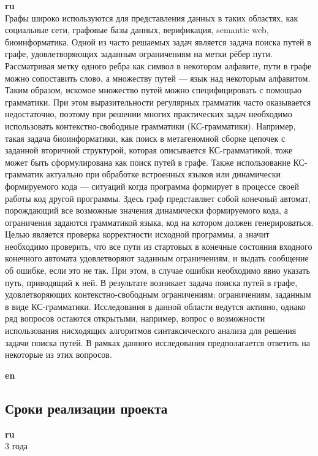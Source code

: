 \documentclass[12pt]{article}  %
\theoremstyle{remark}
\begin{document}
\textbf{ru}\\
Графы широко используются для представления данных в таких областях, как социальные сети, графовые базы данных, верификация, semantic web, биоинформатика. Одной из часто решаемых задач является задача поиска путей в графе, удовлетворяющих заданным ограничениям на метки рёбер пути. Рассматривая метку одного ребра как символ в некотором алфавите, пути в графе можно сопоставить слово, а множеству путей — язык над некоторым алфавитом. Таким образом, искомое множество путей можно специфицировать с помощью грамматики. При этом выразительности регулярных грамматик часто оказывается недостаточно, поэтому при решении многих практических задач необходимо использовать контекстно-свободные грамматики (КС-грамматики). Например, такая задача биоинформатики, как поиск в метагеномной сборке цепочек с заданной вторичной структурой, которая описывается КС-грамматикой, тоже может быть сформулирована как поиск путей в графе. Также использование КС-грамматик актуально при обработке встроенных языков или динамически формируемого кода — ситуаций когда программа формирует в процессе своей работы код другой программы. Здесь граф представляет собой конечный автомат, порождающий все возможные значения динамически формируемого кода, а ограничения задаются грамматикой языка, код на котором должен генерироваться. Целью является проверка корректности исходной программы, а значит необходимо проверить, что все пути из стартовых в конечные состояния входного конечного автомата удовлетворяют заданным ограничениям, и выдать сообщение об ошибке, если это не так. При этом, в случае ошибки необходимо явно указать путь, приводящий к ней. В результате возникает задача поиска путей в графе, удовлетворяющих контекстно-свободным ограничениям: ограничениям, заданным в виде КС-грамматики. Исследования в данной области ведутся активно, однако ряд вопросов остаются открытыми, например, вопрос о возможности использования нисходящих алгоритмов синтаксического анализа для решения задачи поиска путей. В рамках данного исследования предполагается ответить на некоторые из этих вопросов.


\textbf{en}\\


\subsection{Сроки реализации проекта}

\textbf{ru}\\
3 года
\end{document}
